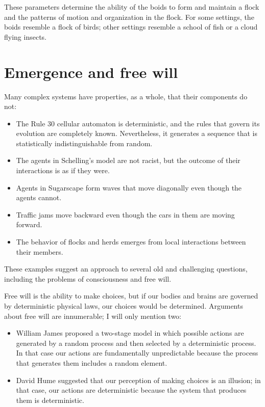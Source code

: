 \documentclass[12pt]{book}
\theoremstyle{exercise}
\begin{document}
These parameters determine the ability of the boids to form and
maintain a flock and the patterns of motion and organization in the
flock.  For some settings, the boids resemble a flock of birds; other
settings resemble a school of fish or a cloud flying insects.


\section{Emergence and free will}
\label{freewill}


Many complex systems have properties, as a whole, that their
components do not:

\begin{itemize}

\item The Rule 30 cellular automaton is deterministic, and the rules
  that govern its evolution are completely known.  Nevertheless, it
  generates a sequence that is statistically indistinguishable from
  random.

\item The agents in Schelling's model are not racist, but the outcome
  of their interactions is as if they were.

\item Agents in Sugarscape form waves that move diagonally even
though the agents cannot.

\item Traffic jams move backward even though the cars in them are
  moving forward.

\item The behavior of flocks and herds emerges from local interactions
  between their members.

\end{itemize}

These examples suggest an approach to several old and challenging
questions, including the problems of consciousness and free will.

Free will is the ability to make choices, but if our bodies and brains
are governed by deterministic physical laws, our choices would be
determined.  Arguments about free will are innumerable; I will
only mention two:

\begin{itemize}

\item William James proposed a two-stage model in which
  possible actions are generated by a random process and then selected
  by a deterministic process.  In that case our actions are
  fundamentally unpredictable because the process that generates them
  includes a random element.

\item David Hume suggested that our perception of making choices
  is an illusion; in that case, our actions are deterministic because
  the system that produces them is deterministic.

\end{itemize}
\end{document}

